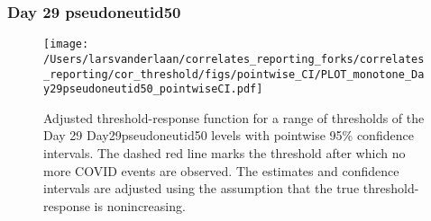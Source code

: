 \documentclass[]{article}
\begin{document}
\clearpage
\clearpage

\clearpage

\hypertarget{day-29-pseudoneutid50-1}{%
\subsubsection{Day 29 pseudoneutid50}\label{day-29-pseudoneutid50-1}}

\begin{figure}[H]
\centering
\texttt{[image: /Users/larsvanderlaan/correlates\_reporting\_forks/correlates\_reporting/cor\_threshold/figs/pointwise\_CI/PLOT\_monotone\_Day29pseudoneutid50\_pointwiseCI.pdf]}
\caption{Adjusted threshold-response function for a range of thresholds of the
  Day 29 Day29pseudoneutid50 levels with pointwise 95\% confidence intervals. The dashed red line marks the threshold after which no more COVID events are observed. The estimates and confidence intervals are adjusted using the assumption that the true threshold-response is nonincreasing.}
\end{figure}
\end{document}
